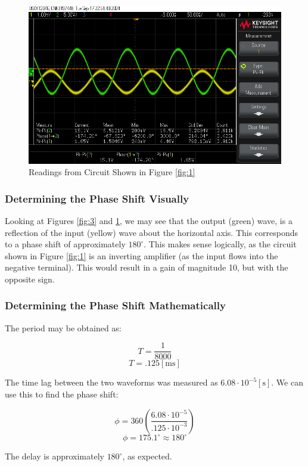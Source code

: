 \documentclass[
	letterpaper, %
	10pt, %
]{CSUniSchoolLabReport}
\begin{document}
\begin{figure}[H]
  \centering
  \includegraphics[width=.9\textwidth]{Figures/L1R1.png}
  \caption{Readings from Circuit Shown in Figure \ref{fig:1}}
  \label{fig:4}
\end{figure}

\subsubsection{Determining the Phase Shift Visually}

Looking at Figures \ref{fig:3} and \ref{fig:4}, we may see that the output (green) wave, is a reflection of the input (yellow) wave about the horizontal axis. This corresponds to a phase shift of approximately $180^{\circ}$. This makes sense logically, as the circuit shown in Figure \ref{fig:1} is an inverting amplifier (as the input flows into the negative terminal). This would result in a gain of magnitude 10, but with the opposite sign.

\subsubsection{Determining the Phase Shift Mathematically}

The period may be obtained as:

$$T=\frac{1}{8000}$$
$$T=.125[\si{\milli\second}]$$

The time lag between the two waveforms was measured as $6.08\cdot10^{-5}[\si{\second}]$. We can use this to find the phase shift:

$$\phi=360\left( \frac{6.08\cdot10^{-5}}{.125\cdot10^{-3}} \right)$$
$$\phi=175.1^{\circ}\approx 180^{\circ}$$

The delay is approximately $180^{\circ}$, as expected.
\end{document}
